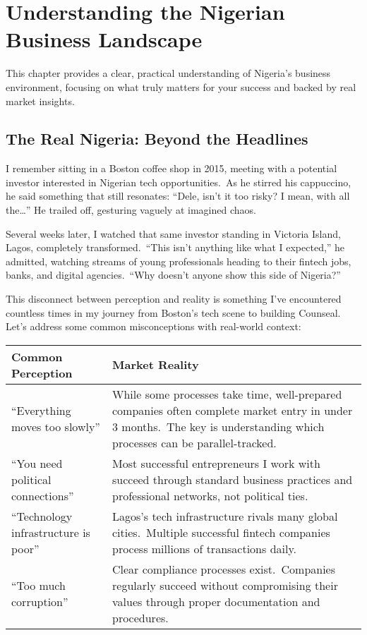 \chapter{Understanding the Nigerian Business Landscape}\label{ch:understanding-the-nigerian-business-landscape}

\begin{importantbox}
This chapter provides a clear, practical understanding of Nigeria's business environment, focusing on what truly matters for your success and backed by real market insights.
\end{importantbox}

\section{The Real Nigeria: Beyond the Headlines}\label{sec:the-real-nigeria:-beyond-the-headlines}

I remember sitting in a Boston coffee shop in 2015, meeting with a potential investor interested in Nigerian tech opportunities.\ As he stirred his cappuccino, he said something that still resonates: ``Dele, isn't it too risky?
I mean, with all the\ldots'' He trailed off, gesturing vaguely at imagined chaos.

Several weeks later, I watched that same investor standing in Victoria Island, Lagos, completely transformed.\ ``This isn't anything like what I expected,'' he admitted, watching streams of young professionals heading to their fintech jobs, banks, and digital agencies.\ ``Why doesn't anyone show this side of Nigeria?''

This disconnect between perception and reality is something I've encountered countless times in my journey from Boston's tech scene to building Counseal.
Let's address some common misconceptions with real-world context:

\begin{center}
\begin{tabularx}{\textwidth}{>{\raggedright\arraybackslash}X >{\raggedright\arraybackslash}X}
    \toprule
    \textbf{Common Perception} & \textbf{Market Reality} \\
    \midrule
    ``Everything moves too slowly'' & While some processes take time, well-prepared companies often complete market entry in under 3 months.\ The key is understanding which processes can be parallel-tracked. \\
    \addlinespace
    ``You need political connections'' & Most successful entrepreneurs I work with succeed through standard business practices and professional networks, not political ties. \\
    \addlinespace
    ``Technology infrastructure is poor'' & Lagos's tech infrastructure rivals many global cities.\ Multiple successful fintech companies process millions of transactions daily. \\
    \addlinespace
    ``Too much corruption'' & Clear compliance processes exist.\ Companies regularly succeed without compromising their values through proper documentation and procedures. \\
    \bottomrule
\end{tabularx}
\end{center}

